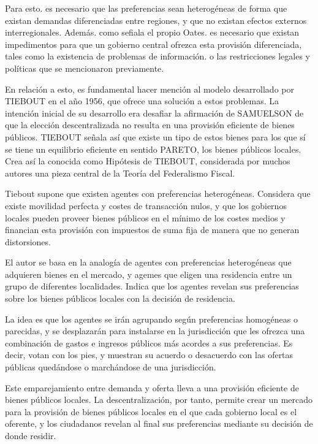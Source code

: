 \documentclass[10pt,a4paper]{article}
\begin{document}
Para esto. es necesario que las preferencias sean heterogéneas de forma que existan demandas diferenciadas entre regiones, y que no existan efectos externos interregionales. Además. como sefiala el propio Oates. es necesario que existan impedimentos para que un gobierno central ofrezca esta provisión diferenciada, tales como la existencia de problemas de información. o las restricciones legales y políticas que se mencionaron previamente.

En relación a esto, es fundamental hacer mención al modelo desarrollado por TIEBOUT en el año 1956, que ofrece una solución a estos problemas. La intención inicial de su desarrollo era desafiar la afirmación de SAMUELSON de que la elección descentralizada no resulta en una provisión eficiente de bienes públicos. TIEBOUT señala así que existe un tipo de estos bienes para los que sí se tiene un equilibrio eficiente en sentido PARETO, los bienes públicos locales. Crea así la conocida como Hipótesis de TIEBOUT, considerada por muchos autores una pieza central de la Teoría del Federalismo Fiscal.

Tiebout supone que existen agentes con preferencias heterogéneas. Considera que existe movilidad perfecta y costes de transacción nulos, y que los gobiernos locales pueden proveer bienes públicos en el mínimo de los costes medios y financian esta provisión con impuestos de suma fija de manera que no generan distorsiones.

El autor se basa en la analogía de agentes con preferencias heterogéneas que adquieren bienes en el mercado, y agemes que eligen una residencia entre un grupo de diferentes localidades. Indica que los agentes revelan sus preferencias sobre los bienes públicos locales con la decisión de residencia.

La idea es que los agentes se irán agrupando según preferencias homogéneas o parecidas, y se desplazarán para instalarse en la jurisdicción que les ofrezca una combinación de gastos e ingresos públicos más acordes a sus preferencias. Es decir, votan con los pies, y muestran su acuerdo o desacuerdo con las ofertas públicas quedándose o marchándose de una jurisdicción.

Este emparejamiento entre demanda y oferta lleva a una provisión eficiente de bienes públicos locales. La descentralización, por tanto, permite crear un mercado para la provisión de bienes públicos locales en el que cada gobierno local es el oferente, y los ciudadanos revelan al final sus preferencias mediante su decisión de donde residir.
\end{document}

